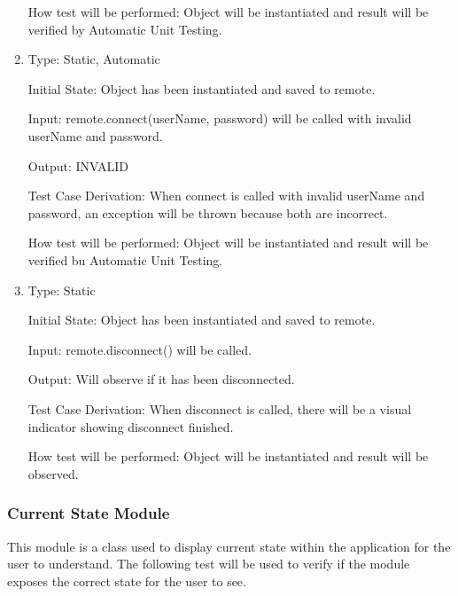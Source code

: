 \documentclass[12pt, titlepage]{article}
\begin{document}
\begin{enumerate}[{UT-RA}1.]
  
  How test will be performed: Object will be instantiated and result will be verified by Automatic Unit Testing.

  \item

  Type: Static, Automatic
            
  Initial State: Object has been instantiated and saved to remote.
            
  Input: remote.connect(userName, password) will be called with invalid userName and password.
            
  Output: INVALID
  
  Test Case Derivation: When connect is called with invalid userName and password, an exception will be thrown because both are incorrect.
  
  
  How test will be performed: Object will be instantiated and result will be verified bu Automatic Unit Testing.

  \item

  Type: Static
            
  Initial State: Object has been instantiated and saved to remote.
            
  Input: remote.disconnect() will be called.
            
  Output: Will observe if it has been disconnected.
  
  Test Case Derivation: When disconnect is called, there will be a visual indicator showing disconnect finished.
  
  
  How test will be performed: Object will be instantiated and result will be observed.

\end{enumerate}

\subsubsection{Current State Module}

This module is a class used to display current state within the application for the user to understand.
The following test will be used to verify if the module exposes the correct state for the user to see.
\end{document}
